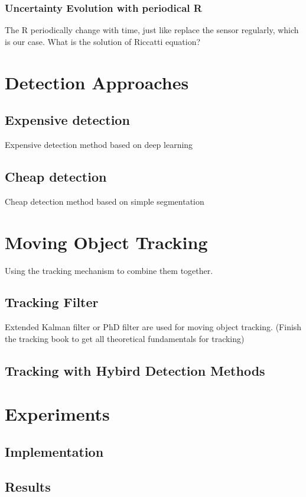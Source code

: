 \documentclass[12pt]{article}
\begin{document}
\subsubsection{Uncertainty Evolution with periodical R}
The R periodically change with time, just like replace the sensor regularly, which is our case. What is the solution of Riccatti equation?


\section{Detection Approaches}\label{hybrid_method}

\subsection{Expensive detection}
Expensive detection method based on deep learning\cite{voxelnet}

\subsection{Cheap detection}
Cheap detection method based on simple segmentation

\section{Moving Object Tracking}

Using the tracking mechanism to combine them together.

\subsection{Tracking Filter}
Extended Kalman filter or PhD filter are used for moving object tracking. (Finish the tracking book to get all theoretical fundamentals for tracking)
\subsection{Tracking with Hybird Detection Methods}




\section{Experiments}\label{experiments}
\subsection{Implementation}\label{Implementation} 


\subsection{Results}
 
 



\end{document}
